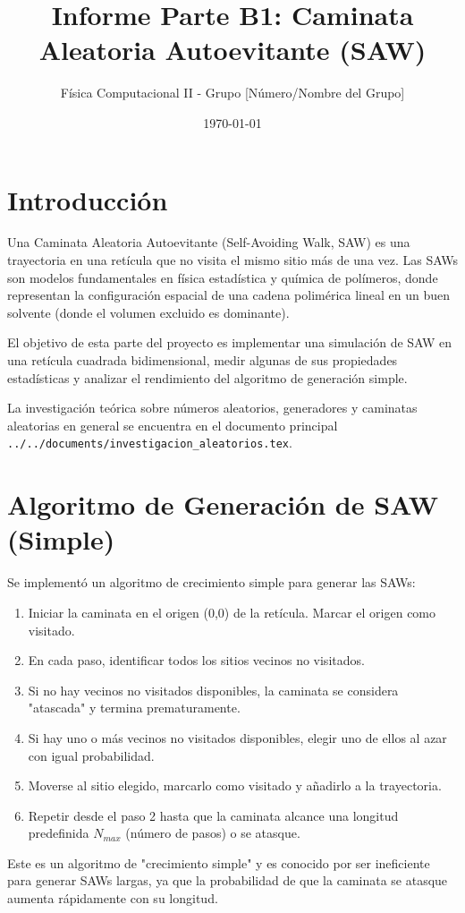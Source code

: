 \documentclass[11pt,a4paper]{article}
\title{Informe Parte B1: Caminata Aleatoria Autoevitante (SAW)}
\author{Física Computacional II - Grupo [Número/Nombre del Grupo]}
\date{\today}
\begin{document}
\maketitle
\tableofcontents
\newpage

\section{Introducción}
Una Caminata Aleatoria Autoevitante (Self-Avoiding Walk, SAW) es una trayectoria en una retícula que no visita el mismo sitio más de una vez. Las SAWs son modelos fundamentales en física estadística y química de polímeros, donde representan la configuración espacial de una cadena polimérica lineal en un buen solvente (donde el volumen excluido es dominante).

El objetivo de esta parte del proyecto es implementar una simulación de SAW en una retícula cuadrada bidimensional, medir algunas de sus propiedades estadísticas y analizar el rendimiento del algoritmo de generación simple.

La investigación teórica sobre números aleatorios, generadores y caminatas aleatorias en general se encuentra en el documento principal \texttt{../../documents/investigacion\_aleatorios.tex}.

\section{Algoritmo de Generación de SAW (Simple)}
Se implementó un algoritmo de crecimiento simple para generar las SAWs:
\begin{enumerate}
    \item Iniciar la caminata en el origen (0,0) de la retícula. Marcar el origen como visitado.
    \item En cada paso, identificar todos los sitios vecinos no visitados.
    \item Si no hay vecinos no visitados disponibles, la caminata se considera "atascada" y termina prematuramente.
    \item Si hay uno o más vecinos no visitados disponibles, elegir uno de ellos al azar con igual probabilidad.
    \item Moverse al sitio elegido, marcarlo como visitado y añadirlo a la trayectoria.
    \item Repetir desde el paso 2 hasta que la caminata alcance una longitud predefinida $N_{max}$ (número de pasos) o se atasque.
\end{enumerate}
Este es un algoritmo de "crecimiento simple" y es conocido por ser ineficiente para generar SAWs largas, ya que la probabilidad de que la caminata se atasque aumenta rápidamente con su longitud.
\end{document}
